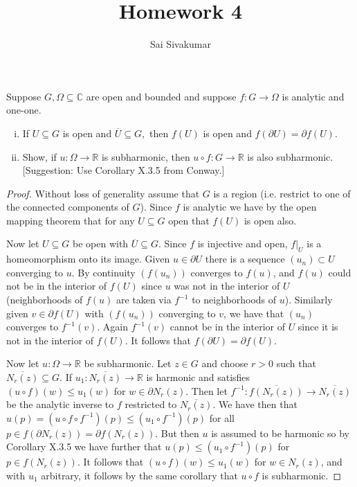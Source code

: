 \documentclass[12pt]{amsart}
\title{Homework 4}
\author{Sai Sivakumar}
\newcommand{\RR}{\mathbb{R}}
\newcommand{\CC}{\mathbb{C}}
\begin{document}
\maketitle

\thispagestyle{empty}

Suppose  $G,\Omega \subseteq \CC$ are open and bounded and suppose $f:G\to\Omega$ is analytic and one-one.  
\begin{enumerate}[(i)]\itemsep=10pt
 \item If $U\subseteq G$ is open and $\overline{U}\subseteq G,$ then $f(U)$ is open and
  $f(\partial U)=\partial f(U).$ 
 \item Show, if $u:\Omega\to\RR$ is subharmonic, then $u\circ f:G\to\RR$ is also subharmonic.
  [Suggestion: Use Corollary X.3.5 from Conway.]
\end{enumerate}

 \bigskip

\begin{proof}
\baselineskip=24pt
Without loss of generality assume that $G$ is a region (i.e. restrict to one of the connected components of $G$). Since $f$ is analytic we have by the open mapping theorem that for any $U\subseteq G$ open that $f(U)$ is open also.

Now let $U\subseteq G$ be open with $\overline{U}\subseteq G$. Since $f$ is injective and open, $f|_U$ is a homeomorphism onto its image. Given $u\in \partial U$ there is a sequence $(u_n)\subset U$ converging to $u$. By continuity $(f(u_n))$ converges to $f(u)$, and $f(u)$ could not be in the interior of $f(U)$ since $u$ was not in the interior of $U$ (neighborhoods of $f(u)$ are taken via $f^{-1}$ to neighborhoods of $u$). Similarly given $v\in \partial f(U)$ with $(f(u_n))$ converging to $v$, we have that $(u_n)$ converges to $f^{-1}(v)$. Again $f^{-1}(v)$ cannot be in the interior of $U$ since it is not in the interior of $f(U)$. It follows that $f(\partial U) = \partial f(U)$. 

Now let $u\colon \Omega\to \mathbb{R}$ be subharmonic. Let $z\in G$ and choose $r>0$ such that $\overline{N_r(z)}\subseteq G$. If $u_1\colon \overline{N_r(z)}\to \mathbb{R}$ is harmonic and satisfies $(u\circ f)(w)\leq u_1(w)$ for $w\in \partial N_r(z)$. Then let $f^{-1}\colon \overline{f(N_r(z))}\to \overline{N_r(z)}$ be the analytic inverse to $f$ restricted to $\overline{N_r(z)}$. We have then that $u(p) = (u\circ f\circ f^{-1})(p)\leq (u_1\circ f^{-1})(p)$ for all $p\in f(\partial N_r(z)) = \partial f(N_r(z))$. But then $u$ is assumed to be harmonic so by Corollary X.3.5 we have further that $u(p)\leq (u_1\circ f^{-1})(p)$ for $p\in f(N_r(z))$. It follows that $(u\circ f)(w)\leq u_1(w)$ for $w\in N_r(z)$, and with $u_1$ arbitrary, it follows by the same corollary that $u\circ f$ is subharmonic.
\end{proof}
\end{document}
